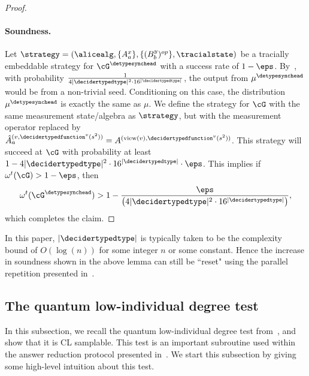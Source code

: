 \begin{proof}
	\paragraph{Soundness. }Let $\strategy = (\alicealg, \{A^x_a\}, \{(B^y_b)^{op}\} ,\tracialstate)$ be a tracially embeddable strategy for $\cG^{\detypesynchead}$ with a success rate of $1 - \eps$. By~, with probability $\frac{1}{4|\decidertypedtype|^2 \cdot 16^{|\decidertypedtype|}}$, the output from $\mu^{\text{\detypesynchead}}$ would be from a non-trivial seed. Conditioning on this case, the distribution $\mu^{\detypesynchead}$ is exactly the same as $\mu$. We define the strategy for $\cG$ with the same measurement state/algebra as $\strategy$, but with the measurement operator replaced by $\hat{A}^{(v, \decidertypedfunction^{v}(s^2))}_{a} = A^{(\text{view}(v), \decidertypedfunction^{v}(s^2))}$. This strategy will succeed at $\cG$ with probability at least $1 - 4|\decidertypedtype|^2 \cdot 16^{|\decidertypedtype|} \cdot \eps$. This implies if $\omega^t(\cG) > 1 - \eps$, then  
	\begin{equation*}
		\omega^{t}(\cG^{\detypesynchead}) > 1 - \frac{\eps}{\left(4|\decidertypedtype|^2 \cdot 16^{|\decidertypedtype|}\right)},
	\end{equation*}
 which completes the claim. 
\end{proof}       

In this paper, $|\decidertypedtype|$ is typically taken to be the complexity bound of $O(\log(n))$ for some integer $n$ or some constant. Hence the increase in soundness shown in the above lemma can still be ``reset" using the parallel repetition presented in~.  




\subsection{The quantum low-individual degree test} \label{sec:lowinddegtest}

In this subsection, we recall the quantum low-individual degree test from~\cite{jiQuantumSoundnessTesting2022}, and show that it is CL samplable. This test is an important subroutine used within the answer reduction protocol presented in~. We start this subsection by giving some high-level intuition about this test. 

